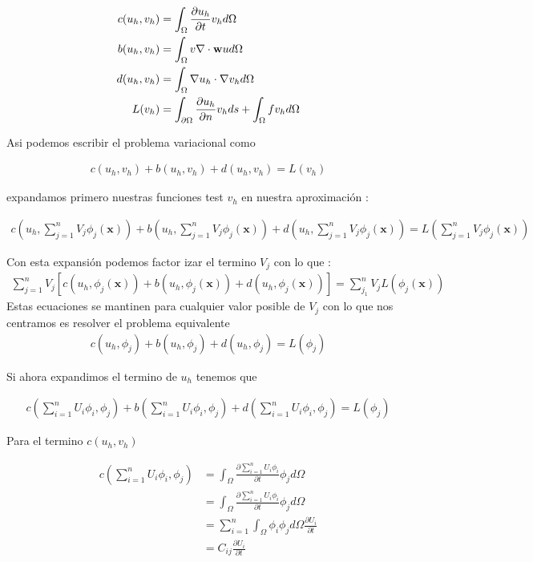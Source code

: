 \documentclass[11pt, spanish]{article}
\begin{document}
 \begin{align}
 c(u_h,v_h) &= \int_\Omega \frac{\partial u_h}{\partial t}v_h d \Omega \\
 b(u_h,v_h) &= \int_\Omega v \nabla \cdot \mathbf{w}u d \Omega \\
 d(u_h,v_h) &= \int_\Omega\nabla u_h\cdot\nabla v_h d \Omega \\
 L(v_h) &=  \int_{\partial\Omega}{\partial u_h\over \partial n}v_h ds + \int_\Omega fv_h d \Omega
 \end{align}
     
 Asi podemos escribir el problema variacional como 

\begin{align}
    c(u_h,v_h) + b(u_h,v_h) + d(u_h,v_h) = L(v_h)
\end{align}

expandamos primero nuestras funciones test $v_h$ en nuestra aproximaci\'on :


 \begin{align}
     c(u_h,\sum_{j=1}^{n} V_j \phi_j(\boldsymbol{x})) + b(u_h,\sum_{j=1}^{n} V_j \phi_j(\boldsymbol{x})) + d(u_h,\sum_{j=1}^{n} V_j \phi_j(\boldsymbol{x})) = L(\sum_{j=1}^{n} V_j \phi_j(\boldsymbol{x}))
 \end{align}

Con esta expansi\'on podemos factor izar el termino $V_j$ con lo que :
\begin{align}
    \sum_{j=1}^{n} V_j \left[ c(u_h,\phi_j(\boldsymbol{x})) + b(u_h,\phi_j(\boldsymbol{x})) + d(u_h,\phi_j(\boldsymbol{x})) \right] = \sum_{j_1}^{n} V_j L(\phi_j(\boldsymbol{x}))
\end{align}
Estas ecuaciones se mantinen para cualquier valor posible de $V_j$ con lo que nos centramos es resolver el problema equivalente 
\begin{align}
    c(u_h,\phi_j) + b(u_h,\phi_j) + d(u_h,\phi_j) = L(\phi_j)
\end{align}

Si ahora expandimos el termino de $u_h$ tenemos que 

\begin{align}
    c(\sum_{i=1}^{n} U_i \phi_i,\phi_j) + b(\sum_{i=1}^{n} U_i \phi_i,\phi_j) + d(\sum_{i=1}^{n} U_i \phi_i,\phi_j) = L(\phi_j)
\end{align}

Para el termino $c(u_h,v_h)$

\begin{align}
    c(\sum_{i=1}^{n} U_i \phi_i,\phi_j) &= \int_\Omega \frac{\partial \sum_{i=1}^{n} U_i \phi_i}{\partial t}\phi_j d \Omega \\
    &=  \int_\Omega \frac{\partial \sum_{i=1}^{n} U_i \phi_i}{\partial t}\phi_j d \Omega \\
    &=  \sum_{i=1}^{n} \int_\Omega  \phi_i \phi_j d\Omega \frac{\partial  U_i }{\partial t}\\
    &= C_{ij} \frac{\partial  U_i }{\partial t} 
\end{align}
\end{document}
